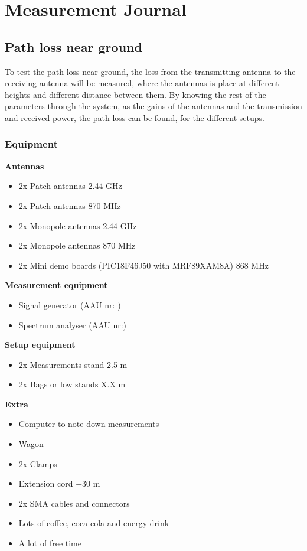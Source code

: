 \chapter{Measurement Journal}

\section*{Path loss near ground}
To test the path loss near ground, the loss from the transmitting antenna to the receiving antenna will be measured, where the antennas is place at different heights and different distance between them. By knowing the rest of the parameters through the system, as the gains of the antennas and the transmission and received power, the path loss can be found, for the different setups.

\subsection*{Equipment}
\textbf{Antennas}
\begin{itemize}
\item 2x Patch antennas 2.44 GHz
\item 2x Patch antennas 870 MHz
\item 2x Monopole antennas 2.44 GHz
\item 2x Monopole antennas 870 MHz
\item 2x Mini demo boards (PIC18F46J50 with MRF89XAM8A) 868 MHz
\end{itemize}

\textbf{Measurement equipment}
\begin{itemize}
\item Signal generator (AAU nr: )
\item Spectrum analyser (AAU nr:)
\end{itemize}

\textbf{Setup equipment}
\begin{itemize}
\item 2x Measurements stand 2.5 m
\item 2x Bags or low stands X.X m
\end{itemize}

\textbf{Extra}
\begin{itemize}
\item Computer to note down measurements
\item Wagon
\item 2x Clamps
\item Extension cord +30 m
\item 2x SMA cables and connectors
\item Lots of coffee, coca cola and energy drink
\item A lot of free time
\end{itemize}

